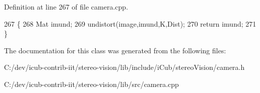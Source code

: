 Definition at line 267 of file camera.\+cpp.


\begin{DoxyCode}
267                                     \{
268     Mat imund;
269     undistort(image,imund,K,Dist);
270     \textcolor{keywordflow}{return} imund;
271 \}
\end{DoxyCode}


The documentation for this class was generated from the following files\+:\begin{DoxyCompactItemize}
\item 
C\+:/dev/icub-\/contrib-\/iit/stereo-\/vision/lib/include/i\+Cub/stereo\+Vision/camera.\+h\item 
C\+:/dev/icub-\/contrib-\/iit/stereo-\/vision/lib/src/camera.\+cpp\end{DoxyCompactItemize}
